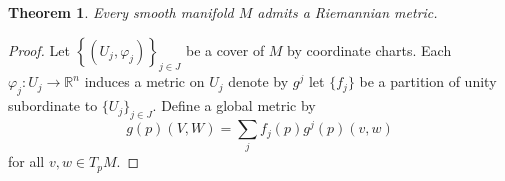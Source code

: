 \documentclass[a4paper]{article}
\newtheorem*{thm}{Theorem}
\begin{document}
\begin{thm}
  Every smooth manifold $M$ admits a Riemannian metric. 
\end{thm}

\begin{proof}
  Let $\left\{ (U_j,\varphi_j) \right\}_{j\in J}$ be a cover of $M$ by coordinate charts. Each $\varphi_j: U_j \rightarrow \mathds{R}^n$ induces a metric on $U_j$ denote by $g^j$ let $\{f_j\}$ be a partition of unity subordinate to $\{U_j\}_{j \in J}$. Define a global metric by
  \[
    g(p)(V,W) =  \sum_{j} f_j(p) g^j(p)(v,w)
  \]
  for all $v,w \in T_pM$.
\end{proof}
\end{document}
